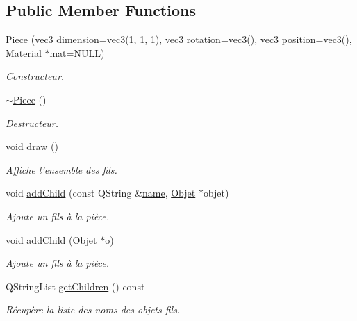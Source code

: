 \subsection*{Public Member Functions}
\begin{DoxyCompactItemize}
\item 
\hyperlink{class_piece_adfc1a07bd6a58ab6cac476fedb38cb15}{Piece} (\hyperlink{structvec3}{vec3} dimension=\hyperlink{structvec3}{vec3}(1, 1, 1), \hyperlink{structvec3}{vec3} \hyperlink{class_objet_ac69a1b459bcb4433099c8cfbff06b209}{rotation}=\hyperlink{structvec3}{vec3}(), \hyperlink{structvec3}{vec3} \hyperlink{class_objet_a0e109bc790b14328202dd2546b04e2fd}{position}=\hyperlink{structvec3}{vec3}(), \hyperlink{class_material}{Material} $\ast$mat=N\+U\+L\+L)
\begin{DoxyCompactList}\small\item\em Constructeur. \end{DoxyCompactList}\item 
\hyperlink{class_piece_a5d7a4f6bade94cb33b6f634de8aa7918}{$\sim$\+Piece} ()
\begin{DoxyCompactList}\small\item\em Destructeur. \end{DoxyCompactList}\item 
void \hyperlink{class_piece_aee937e57fbfe4717aab14e1e892aed2e}{draw} ()
\begin{DoxyCompactList}\small\item\em Affiche l'ensemble des fils. \end{DoxyCompactList}\item 
void \hyperlink{class_piece_adf4f51a5f33071fd0acc706c347f4741}{add\+Child} (const Q\+String \&\hyperlink{class_objet_a4a702c189bedcbf1e65da6aec72c8e44}{name}, \hyperlink{class_objet}{Objet} $\ast$objet)
\begin{DoxyCompactList}\small\item\em Ajoute un fils à la pièce. \end{DoxyCompactList}\item 
void \hyperlink{class_piece_aeb48b4fda2f8950546baf534b3cf08cf}{add\+Child} (\hyperlink{class_objet}{Objet} $\ast$o)
\begin{DoxyCompactList}\small\item\em Ajoute un fils à la pièce. \end{DoxyCompactList}\item 
Q\+String\+List \hyperlink{class_piece_a029823aa5135b356a9e4da14578db4e8}{get\+Children} () const 
\begin{DoxyCompactList}\small\item\em Récupère la liste des noms des objets fils. \end{DoxyCompactList}\item 

\end{DoxyCompactItemize}

